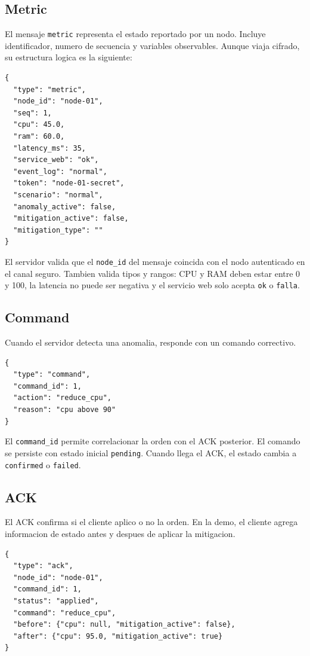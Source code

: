 \documentclass[11pt,letterpaper]{article}
\begin{document}
\subsection{Metric}

El mensaje \texttt{metric} representa el estado reportado por un nodo. Incluye
identificador, numero de secuencia y variables observables. Aunque viaja cifrado,
su estructura logica es la siguiente:

\begin{lstlisting}[style=json]
{
  "type": "metric",
  "node_id": "node-01",
  "seq": 1,
  "cpu": 45.0,
  "ram": 60.0,
  "latency_ms": 35,
  "service_web": "ok",
  "event_log": "normal",
  "token": "node-01-secret",
  "scenario": "normal",
  "anomaly_active": false,
  "mitigation_active": false,
  "mitigation_type": ""
}
\end{lstlisting}

El servidor valida que el \texttt{node\_id} del mensaje coincida con el nodo
autenticado en el canal seguro. Tambien valida tipos y rangos: CPU y RAM deben
estar entre 0 y 100, la latencia no puede ser negativa y el servicio web solo
acepta \texttt{ok} o \texttt{falla}.

\subsection{Command}

Cuando el servidor detecta una anomalia, responde con un comando correctivo.

\begin{lstlisting}[style=json]
{
  "type": "command",
  "command_id": 1,
  "action": "reduce_cpu",
  "reason": "cpu above 90"
}
\end{lstlisting}

El \texttt{command\_id} permite correlacionar la orden con el ACK posterior. El
comando se persiste con estado inicial \texttt{pending}. Cuando llega el ACK, el
estado cambia a \texttt{confirmed} o \texttt{failed}.

\subsection{ACK}

El ACK confirma si el cliente aplico o no la orden. En la demo, el cliente agrega
informacion de estado antes y despues de aplicar la mitigacion.

\begin{lstlisting}[style=json]
{
  "type": "ack",
  "node_id": "node-01",
  "command_id": 1,
  "status": "applied",
  "command": "reduce_cpu",
  "before": {"cpu": null, "mitigation_active": false},
  "after": {"cpu": 95.0, "mitigation_active": true}
}
\end{lstlisting}
\end{document}
